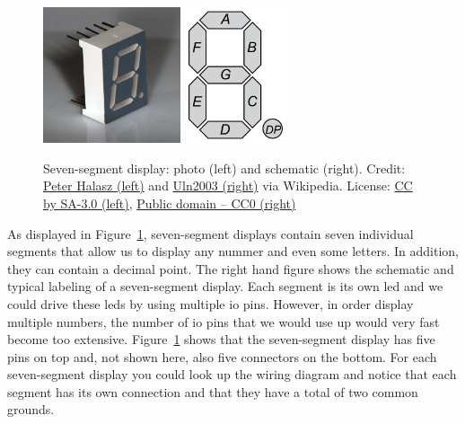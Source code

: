 \begin{figure}[htb]
    \centering
    \includegraphics[height=4cm]{graphics/02_display/7seg_photo.jpg} \hspace{1.5cm}
    \includegraphics[height=4cm]{graphics/02_display/7seg_schematic.png}
    \caption{Seven-segment display: photo (left) and schematic (right). Credit: \href{https://en.wikipedia.org/wiki/Seven-segment_display\#/media/File:Seven_segment_01_Pengo.jpg}{Peter Halasz (left)} and \href{https://en.wikipedia.org/wiki/Seven-segment_display\#/media/File:7_Segment_Display_with_Labeled_Segments.svg}{Uln2003 (right)} via Wikipedia. License: \href{https://creativecommons.org/licenses/by-sa/3.0/}{CC by SA-3.0 (left)}, \href{https://en.wikipedia.org/wiki/Seven-segment_display\#/media/File:7_Segment_Display_with_Labeled_Segments.svg}{Public domain -- CC0 (right)}}
    \label{fig:display:7seg}
\end{figure}
As displayed in Figure~\ref{fig:display:7seg}, seven-segment displays contain seven individual segments that allow us to display any nummer and even some letters. In addition, they can contain a decimal point. The right hand figure shows the schematic and typical labeling of a seven-segment display. Each segment is its own \ac{led} and we could drive these \acp{led} by using multiple \ac{io} pins. However, in order display multiple numbers, the number of \ac{io} pins that we would use up would very fast become too extensive. Figure~\ref{fig:display:7seg} shows that the seven-segment display has five pins on top and, not shown here, also five connectors on the bottom. For each seven-segment display you could look up the wiring diagram and notice that each segment has its own connection and that they have a total of two common grounds.

